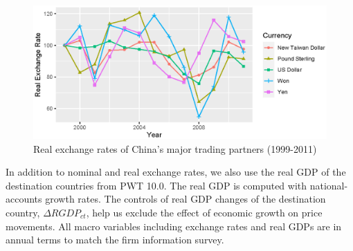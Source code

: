 \begin{figure}[htbp]
	\centering
	\includegraphics[width=1\textwidth]{figure/figure2.eps}
	\caption{Real exchange rates of China's major trading partners (1999-2011)}
	\label{fig3.2}
\end{figure}

In addition to nominal and real exchange rates, we also use the real GDP of the destination countries from PWT 10.0. The real GDP is computed with national-accounts growth rates. The controls of real GDP changes of the destination country, $\Delta RGDP_{ct}$, help us exclude the effect of economic growth on price movements. All macro variables including exchange rates and real GDPs are in annual terms to match the firm information survey.